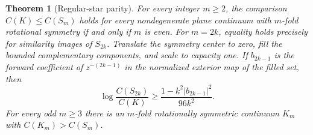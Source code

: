 \documentclass[11pt]{article}
\newtheorem{theorem}{Theorem}
\begin{document}
	\begin{theorem}[Regular-star parity]\label{thm:parity}
		For every integer $m\geq2$, the comparison
		$C(K)\leq C(S_m)$ holds for every nondegenerate plane continuum
		with $m$-fold rotational symmetry if and only if $m$ is even.
		For $m=2k$, equality holds precisely for similarity images of
		$S_{2k}$. Translate the symmetry center to zero, fill the bounded
		complementary components, and scale to capacity one. If $b_{2k-1}$
		is the \emph{forward} coefficient of $z^{-(2k-1)}$ in the
		normalized exterior map of the filled set, then
		\begin{equation}\label{eq:star-quant}
			\log\frac{C(S_{2k})}{C(K)}
			\geq\frac{1-k^2|b_{2k-1}|^2}{96k^2}.
		\end{equation}
		For every odd $m\geq3$ there is an $m$-fold rotationally symmetric continuum
		$K_m$ with $C(K_m)>C(S_m)$.
	\end{theorem}
\end{document}
